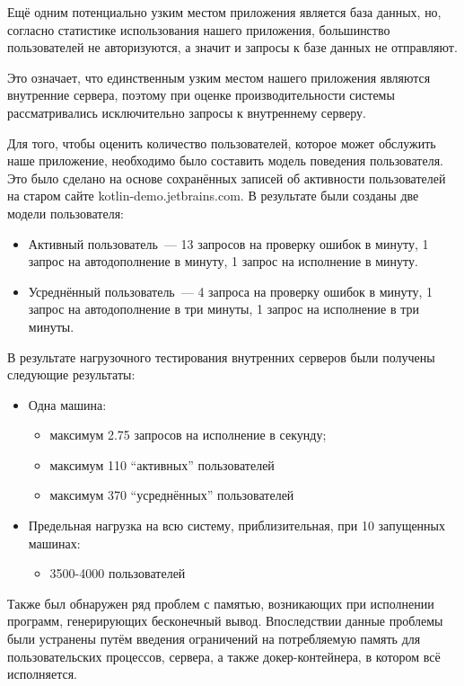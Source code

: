 	Ещё одним потенциально узким местом приложения является база данных, но, согласно статистике использования нашего приложения, большинство пользователей не авторизуются, а значит и запросы к базе данных не отправляют.
	
	Это означает, что единственным узким местом нашего приложения являются внутренние сервера, поэтому при оценке производительности системы рассматривались исключительно запросы к внутреннему серверу.

	Для того, чтобы оценить количество пользователей, которое может обслужить наше приложение, необходимо было составить модель поведения пользователя. Это было сделано на основе сохранённых записей об активности пользователей на старом сайте kotlin-demo.jetbrains.com. В результате были созданы две модели пользователя:
\begin{itemize}
	\item Активный пользователь~--- 13 запросов на проверку ошибок в минуту, 1 запрос на автодополнение в минуту, 1 запрос на исполнение в минуту.
	\item Усреднённый пользователь~--- 4 запроса на проверку ошибок в минуту, 1 запрос на автодополнение в три минуты, 1 запрос на исполнение в три минуты.
\end{itemize}
	
	В результате нагрузочного тестирования внутренних серверов были получены следующие результаты:
	\begin{itemize}
		\item Одна машина:
		\begin{itemize}
			\item максимум 2.75 запросов на исполнение в секунду;
			\item максимум 110 ``активных'' пользователей
			\item максимум 370 ``усреднённых'' пользователей
		\end{itemize}
		
		\item Предельная нагрузка на всю систему, приблизительная, при 10 запущенных машинах:
		\begin{itemize}
			\item 3500-4000 пользователей
		\end{itemize} 
	\end{itemize}
	Также был обнаружен ряд проблем с памятью, возникающих при исполнении программ, генерирующих бесконечный вывод. Впоследствии данные проблемы были устранены путём введения ограничений на потребляемую память для пользовательских процессов, сервера, а также докер-контейнера, в котором всё исполняется.
	
